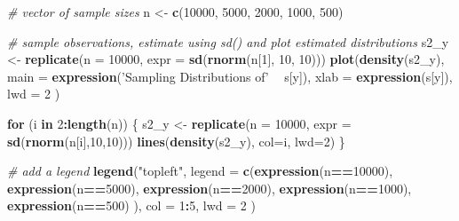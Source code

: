 \documentclass[]{book}
\newenvironment{Shaded}{\begin{snugshade}}{\end{snugshade}}
\newcommand{\KeywordTok}[1]{\textcolor[rgb]{0.13,0.29,0.53}{\textbf{#1}}}
\newcommand{\DataTypeTok}[1]{\textcolor[rgb]{0.13,0.29,0.53}{#1}}
\newcommand{\DecValTok}[1]{\textcolor[rgb]{0.00,0.00,0.81}{#1}}
\newcommand{\StringTok}[1]{\textcolor[rgb]{0.31,0.60,0.02}{#1}}
\newcommand{\CommentTok}[1]{\textcolor[rgb]{0.56,0.35,0.01}{\textit{#1}}}
\newcommand{\ControlFlowTok}[1]{\textcolor[rgb]{0.13,0.29,0.53}{\textbf{#1}}}
\newcommand{\OperatorTok}[1]{\textcolor[rgb]{0.81,0.36,0.00}{\textbf{#1}}}
\newcommand{\NormalTok}[1]{#1}
\theoremstyle{definition}
\theoremstyle{definition}
\theoremstyle{definition}
\theoremstyle{remark}
\begin{document}
\begin{Shaded}
\begin{Highlighting}[]
\CommentTok{# vector of sample sizes}
\NormalTok{n <-}\StringTok{ }\KeywordTok{c}\NormalTok{(}\DecValTok{10000}\NormalTok{, }\DecValTok{5000}\NormalTok{, }\DecValTok{2000}\NormalTok{, }\DecValTok{1000}\NormalTok{, }\DecValTok{500}\NormalTok{)}

\CommentTok{# sample observations, estimate using sd() and plot estimated distributions}
\NormalTok{s2_y <-}\StringTok{ }\KeywordTok{replicate}\NormalTok{(}\DataTypeTok{n =} \DecValTok{10000}\NormalTok{, }\DataTypeTok{expr =} \KeywordTok{sd}\NormalTok{(}\KeywordTok{rnorm}\NormalTok{(n[}\DecValTok{1}\NormalTok{], }\DecValTok{10}\NormalTok{, }\DecValTok{10}\NormalTok{)))}
\KeywordTok{plot}\NormalTok{(}\KeywordTok{density}\NormalTok{(s2_y),}
     \DataTypeTok{main =} \KeywordTok{expression}\NormalTok{(}\StringTok{'Sampling Distributions of'} \OperatorTok{~}\StringTok{ }\NormalTok{s[y]),}
     \DataTypeTok{xlab =} \KeywordTok{expression}\NormalTok{(s[y]),}
     \DataTypeTok{lwd =} \DecValTok{2}
\NormalTok{     )}

\ControlFlowTok{for}\NormalTok{ (i }\ControlFlowTok{in} \DecValTok{2}\OperatorTok{:}\KeywordTok{length}\NormalTok{(n)) \{}
\NormalTok{  s2_y <-}\StringTok{ }\KeywordTok{replicate}\NormalTok{(}\DataTypeTok{n =} \DecValTok{10000}\NormalTok{, }\DataTypeTok{expr =} \KeywordTok{sd}\NormalTok{(}\KeywordTok{rnorm}\NormalTok{(n[i],}\DecValTok{10}\NormalTok{,}\DecValTok{10}\NormalTok{)))}
  \KeywordTok{lines}\NormalTok{(}\KeywordTok{density}\NormalTok{(s2_y), }
        \DataTypeTok{col=}\NormalTok{i, }
        \DataTypeTok{lwd=}\DecValTok{2}\NormalTok{)}
\NormalTok{\}}

\CommentTok{# add a legend}
\KeywordTok{legend}\NormalTok{(}\StringTok{"topleft"}\NormalTok{,}
       \DataTypeTok{legend =} \KeywordTok{c}\NormalTok{(}\KeywordTok{expression}\NormalTok{(n}\OperatorTok{==}\DecValTok{10000}\NormalTok{),}
                  \KeywordTok{expression}\NormalTok{(n}\OperatorTok{==}\DecValTok{5000}\NormalTok{),}
                  \KeywordTok{expression}\NormalTok{(n}\OperatorTok{==}\DecValTok{2000}\NormalTok{),}
                  \KeywordTok{expression}\NormalTok{(n}\OperatorTok{==}\DecValTok{1000}\NormalTok{),}
                  \KeywordTok{expression}\NormalTok{(n}\OperatorTok{==}\DecValTok{500}\NormalTok{)}
\NormalTok{       ), }
       \DataTypeTok{col =} \DecValTok{1}\OperatorTok{:}\DecValTok{5}\NormalTok{,}
       \DataTypeTok{lwd =} \DecValTok{2}
\NormalTok{)}
\end{Highlighting}
\end{Shaded}
\end{document}
